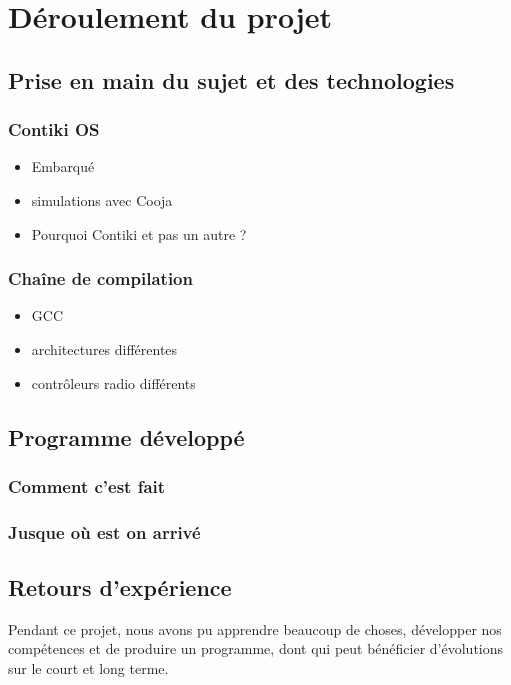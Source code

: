\chapter{Déroulement du projet}
\label{sec:deroulement}

\section{Prise en main du sujet et des technologies}
	
	\subsection{Contiki OS}
		\begin{itemize}
			\item Embarqué
			\item simulations avec Cooja
			\item Pourquoi Contiki et pas un autre ?
		\end{itemize}
	
	\subsection{Chaîne de compilation}
		\begin{itemize}
			\item GCC
			\item architectures différentes
			\item contrôleurs radio différents
		\end{itemize}

\section{Programme développé}
	\subsection{Comment c'est fait}
	\subsection{Jusque où est on arrivé}

\section{Retours d'expérience} %
    Pendant ce projet, nous avons pu apprendre beaucoup de choses, développer nos compétences et de produire un programme, dont qui peut bénéficier d'évolutions sur le court et long terme.
    
